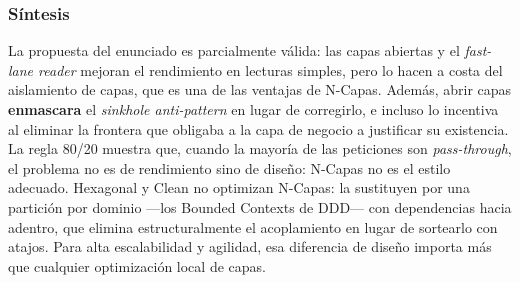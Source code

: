 \subsubsection{Síntesis}
La propuesta del enunciado es parcialmente válida: las capas abiertas y el \emph{fast-lane reader} mejoran el rendimiento en lecturas simples, pero lo hacen a costa del aislamiento de capas, que es una de las ventajas de N-Capas. Además, abrir capas \textbf{enmascara} el \emph{sinkhole anti-pattern} en lugar de corregirlo, e incluso lo incentiva al eliminar la frontera que obligaba a la capa de negocio a justificar su existencia. La regla 80/20 muestra que, cuando la mayoría de las peticiones son \emph{pass-through}, el problema no es de rendimiento sino de diseño: N-Capas no es el estilo adecuado. Hexagonal y Clean no optimizan N-Capas: la sustituyen por una partición por dominio —los Bounded Contexts de DDD— con dependencias hacia adentro, que elimina estructuralmente el acoplamiento en lugar de sortearlo con atajos. Para alta escalabilidad y agilidad, esa diferencia de diseño importa más que cualquier optimización local de capas.